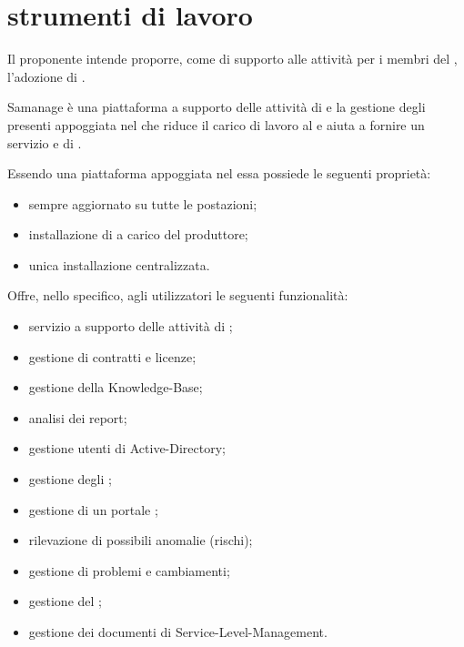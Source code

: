%
%
\section[Strumenti di lavoro]{strumenti di lavoro}
\label{sd-tools}
Il proponente intende proporre, come  di supporto alle attività per i membri del , l'adozione di .

Samanage è una piattaforma a supporto delle attività di  e la gestione degli  presenti appoggiata nel  che riduce il carico di lavoro al  e aiuta a fornire un servizio  e di .

Essendo una piattaforma appoggiata nel  essa possiede le seguenti proprietà:

\begin{itemize}
\item{ sempre aggiornato su tutte le postazioni;}
\item{installazione di  a carico del produttore;}
\item{unica installazione centralizzata.}
\end{itemize}

Offre, nello specifico, agli utilizzatori le seguenti funzionalità:

\begin{itemize}
\item{servizio a supporto delle attività di ;}
\item{gestione di contratti e licenze;}
\item{gestione della \ac{Knowledge-Base};}
\item{analisi dei report;}
\item{gestione utenti di \ac{Active-Directory};}
\item{gestione degli ;}
\item{gestione di un portale ;}
\item{rilevazione di possibili anomalie (rischi);}
\item{gestione di problemi e cambiamenti;}
\item{gestione del ;}
\item{gestione dei documenti di \ac{Service-Level-Management}.}
\end{itemize}

